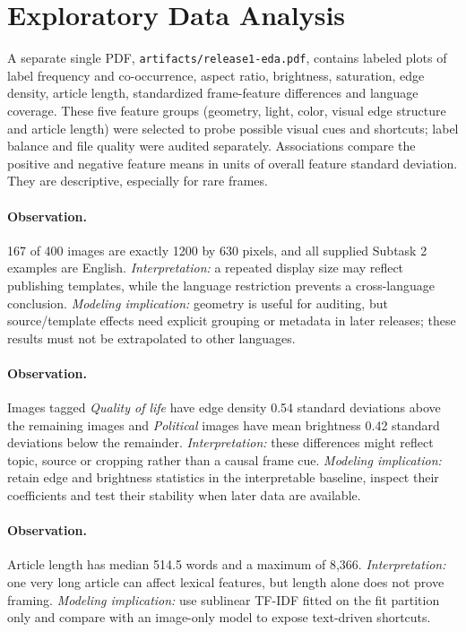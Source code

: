 \documentclass[11pt]{article}
\begin{document}
\section{Exploratory Data Analysis}\label{sec:eda}
A separate single PDF, \texttt{artifacts/release1-eda.pdf}, contains labeled plots of label frequency and co-occurrence, aspect ratio, brightness, saturation, edge density, article length, standardized frame-feature differences and language coverage. These five feature groups (geometry, light, color, visual edge structure and article length) were selected to probe possible visual cues and shortcuts; label balance and file quality were audited separately. Associations compare the positive and negative feature means in units of overall feature standard deviation. They are descriptive, especially for rare frames.

\paragraph{Observation.} 167 of 400 images are exactly 1200 by 630 pixels, and all supplied Subtask 2 examples are English. \emph{Interpretation:} a repeated display size may reflect publishing templates, while the language restriction prevents a cross-language conclusion. \emph{Modeling implication:} geometry is useful for auditing, but source/template effects need explicit grouping or metadata in later releases; these results must not be extrapolated to other languages.

\paragraph{Observation.} Images tagged \emph{Quality of life} have edge density 0.54 standard deviations above the remaining images and \emph{Political} images have mean brightness 0.42 standard deviations below the remainder. \emph{Interpretation:} these differences might reflect topic, source or cropping rather than a causal frame cue. \emph{Modeling implication:} retain edge and brightness statistics in the interpretable baseline, inspect their coefficients and test their stability when later data are available.

\paragraph{Observation.} Article length has median 514.5 words and a maximum of 8,366. \emph{Interpretation:} one very long article can affect lexical features, but length alone does not prove framing. \emph{Modeling implication:} use sublinear TF-IDF fitted on the fit partition only and compare with an image-only model to expose text-driven shortcuts.
\end{document}
